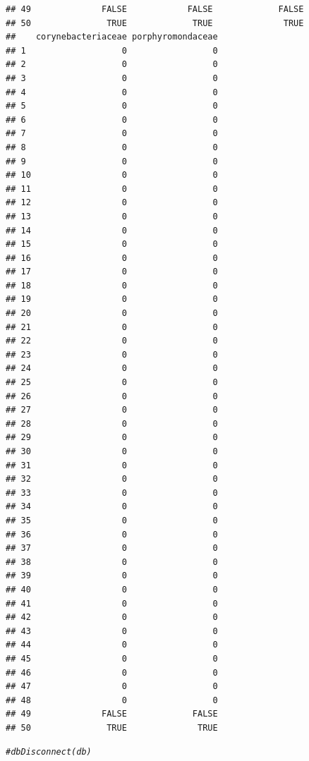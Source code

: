 \documentclass[10pt,handout,english]{beamer}\usepackage[]{graphicx}\usepackage[]{color}
\makeatletter
\newcommand{\hlcom}[1]{\textcolor[rgb]{0.678,0.584,0.686}{\textit{#1}}}%
\newenvironment{kframe}{%
 \def\at@end@of@kframe{}%
 \ifinner\ifhmode%
  \def\at@end@of@kframe{\end{minipage}}%
  \begin{minipage}{\columnwidth}%
 \fi\fi%
 \def\FrameCommand##1{\hskip\@totalleftmargin \hskip-\fboxsep
 \colorbox{shadecolor}{##1}\hskip-\fboxsep
     \hskip-\linewidth \hskip-\@totalleftmargin \hskip\columnwidth}%
 \MakeFramed {\advance\hsize-\width
   \@totalleftmargin\z@ \linewidth\hsize
   \@setminipage}}%
 {\par\unskip\endMakeFramed%
 \at@end@of@kframe}
\newenvironment{knitrout}{}{} %
\makeatother
\begin{document}
\begin{frame}[fragile]
\begin{knitrout}
\begin{kframe}
\begin{verbatim}
## 49              FALSE            FALSE             FALSE
## 50               TRUE             TRUE              TRUE
##    corynebacteriaceae porphyromondaceae
## 1                   0                 0
## 2                   0                 0
## 3                   0                 0
## 4                   0                 0
## 5                   0                 0
## 6                   0                 0
## 7                   0                 0
## 8                   0                 0
## 9                   0                 0
## 10                  0                 0
## 11                  0                 0
## 12                  0                 0
## 13                  0                 0
## 14                  0                 0
## 15                  0                 0
## 16                  0                 0
## 17                  0                 0
## 18                  0                 0
## 19                  0                 0
## 20                  0                 0
## 21                  0                 0
## 22                  0                 0
## 23                  0                 0
## 24                  0                 0
## 25                  0                 0
## 26                  0                 0
## 27                  0                 0
## 28                  0                 0
## 29                  0                 0
## 30                  0                 0
## 31                  0                 0
## 32                  0                 0
## 33                  0                 0
## 34                  0                 0
## 35                  0                 0
## 36                  0                 0
## 37                  0                 0
## 38                  0                 0
## 39                  0                 0
## 40                  0                 0
## 41                  0                 0
## 42                  0                 0
## 43                  0                 0
## 44                  0                 0
## 45                  0                 0
## 46                  0                 0
## 47                  0                 0
## 48                  0                 0
## 49              FALSE             FALSE
## 50               TRUE              TRUE
\end{verbatim}
\begin{alltt}
\hlcom{#dbDisconnect(db)}
\end{alltt}
\end{kframe}
\end{knitrout}
               


\end{frame}
\end{document}
